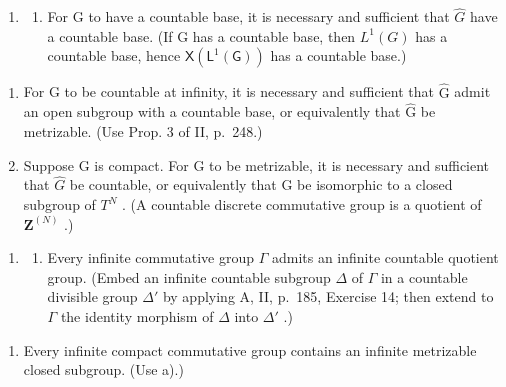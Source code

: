 
\begin{enumerate}
\def\labelenumi{\arabic{enumi})}
\tightlist
\item
  \begin{enumerate}
  \def\labelenumii{\alph{enumii})}
  \tightlist
  \item
    For G to have a countable base, it is necessary and sufficient that \(\widehat{G}\) have a countable base. (If G has a countable base, then \(L^{1}(G)\) has a countable base, hence \(\mathsf{X}(\mathsf{L}^{1}(\mathsf{G}))\) has a countable base.)
  \end{enumerate}
\end{enumerate}

\begin{enumerate}
\def\labelenumi{\alph{enumi})}
\setcounter{enumi}{1}
\item
  For G to be countable at infinity, it is necessary and sufficient that \(\widehat{\mathrm{G}}\) admit an open subgroup with a countable base, or equivalently that \(\widehat{\mathrm{G}}\) be metrizable. (Use Prop. 3 of II, p.~248.)
\item
  Suppose G is compact. For G to be metrizable, it is necessary and sufficient that \(\widehat{G}\) be countable, or equivalently that G be isomorphic to a closed subgroup of \(T^{N}\) . (A countable discrete commutative group is a quotient of \(\mathbf{Z}^{(N)}\) .)
\end{enumerate}

\begin{enumerate}
\def\labelenumi{\arabic{enumi})}
\setcounter{enumi}{1}
\tightlist
\item
  \begin{enumerate}
  \def\labelenumii{\alph{enumii})}
  \tightlist
  \item
    Every infinite commutative group \(\Gamma\) admits an infinite countable quotient group. (Embed an infinite countable subgroup \(\Delta\) of \(\Gamma\) in a countable divisible group \(\Delta'\) by applying A, II, p.~185, Exercise 14; then extend to \(\Gamma\) the identity morphism of \(\Delta\) into \(\Delta'\) .)
  \end{enumerate}
\end{enumerate}

\begin{enumerate}
\def\labelenumi{\alph{enumi})}
\setcounter{enumi}{1}
\tightlist
\item
  Every infinite compact commutative group contains an infinite metrizable closed subgroup. (Use a).)
\end{enumerate}

